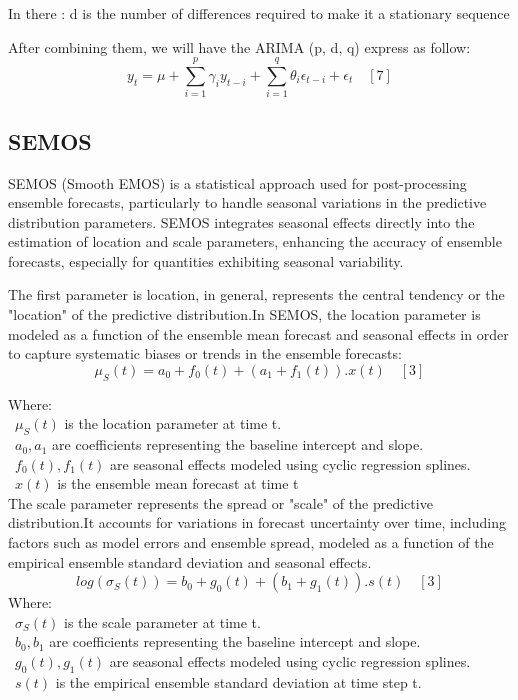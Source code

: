 \documentclass{ieeeojies}
\begin{document}
In there : d is the number of differences required to make it a stationary sequence 

After combining them, we will have the ARIMA (p, d, q) express as follow:
$$
y_t=\mu+\sum_{i=1}^p \gamma_i y_{t-i}+\sum_{i=1}^q \theta_i \epsilon_{t-i}+\epsilon_t \quad [7]
$$
\subsection{SEMOS}
SEMOS (Smooth EMOS) is a statistical approach used for post-processing ensemble forecasts, particularly to handle seasonal variations in the predictive distribution parameters. SEMOS integrates seasonal effects directly into the estimation of location and scale parameters, enhancing the accuracy of ensemble forecasts, especially for quantities exhibiting seasonal variability.

The first parameter is location, in general, represents the central tendency or the "location" of the predictive distribution.In SEMOS, the location parameter is modeled as a function of the ensemble mean forecast and seasonal effects in order to capture systematic biases or trends in the ensemble forecasts:
$$
\mu_S(t) = a_0 + f_0(t) + (a_1 + f_1(t)) . x(t) \quad[3]
$$

Where: \\
        \indent\textbullet\ \(\mu_S(t)\) is the location parameter at time t. \\
        \indent\textbullet\ \(a_0, a_1\) are coefficients representing the baseline intercept and slope. \\
        \indent\textbullet\ \(f_0(t), f_1(t)\) are seasonal effects modeled using cyclic regression splines. \\
        \indent\textbullet\ \(x(t)\) is the ensemble mean forecast at time t \\

The scale parameter represents the spread or "scale" of the predictive distribution.It accounts for variations in forecast uncertainty over time, including factors such as model errors and ensemble spread, modeled as a function of the empirical ensemble standard deviation and seasonal effects.
\[log(\sigma_S(t)) = b_0 + g_0(t) + (b_1 + g_1(t)).s(t) \quad[3]\]
Where: \\
        \indent\textbullet\ \(\sigma_S(t)\) is the scale parameter at time t. \\
        \indent\textbullet\ \(b_0, b_1\) are coefficients representing the baseline intercept and slope. \\
        \indent\textbullet\ \(g_0(t), g_1(t)\) are seasonal effects modeled using cyclic regression splines. \\
        \indent\textbullet\ \(s(t)\) is the empirical ensemble standard deviation at time step t.
\end{document}
